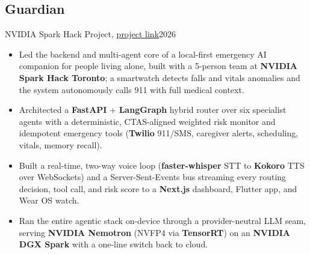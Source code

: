 \subsection{Guardian}{NVIDIA Spark Hack Project, \href{https://github.com/Angel-Guardians/Guardians}{project link}}{2026}
\begin{itemize}
    \item Led the backend and multi-agent core of a local-first emergency AI companion for people living alone, built with a 5-person team at \textbf{NVIDIA Spark Hack Toronto}; a smartwatch detects falls and vitals anomalies and the system autonomously calls 911 with full medical context.
    \item Architected a \textbf{FastAPI} + \textbf{LangGraph} hybrid router over six specialist agents with a deterministic, CTAS-aligned weighted risk monitor and idempotent emergency tools (\textbf{Twilio} 911/SMS, caregiver alerts, scheduling, vitals, memory recall).
    \item Built a real-time, two-way voice loop (\textbf{faster-whisper} STT to \textbf{Kokoro} TTS over WebSockets) and a Server-Sent-Events bus streaming every routing decision, tool call, and risk score to a \textbf{Next.js} dashboard, Flutter app, and Wear OS watch.
    \item Ran the entire agentic stack on-device through a provider-neutral LLM seam, serving \textbf{NVIDIA Nemotron} (NVFP4 via \textbf{TensorRT}) on an \textbf{NVIDIA DGX Spark} with a one-line switch back to cloud.
\end{itemize}

